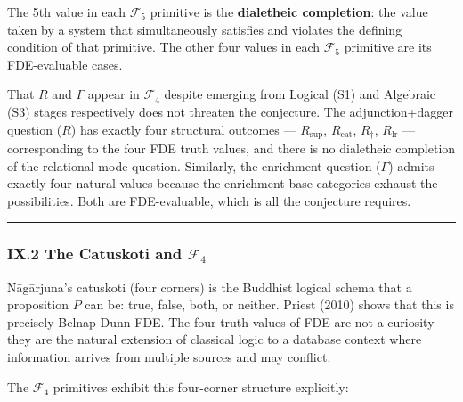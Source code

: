 \documentclass[12pt,a4paper]{article}
\begin{document}
The 5th value in each $\mathcal{F}_5$ primitive is the \textbf{dialetheic completion}: the value taken by a system that simultaneously satisfies and violates the defining condition of that primitive. The other four values in each $\mathcal{F}_5$ primitive are its FDE-evaluable cases.

That $R$ and $\Gamma$ appear in $\mathcal{F}_4$ despite emerging from Logical (S1) and Algebraic (S3) stages respectively does not threaten the conjecture. The adjunction+dagger question ($R$) has exactly four structural outcomes --- $R_\text{sup}$, $R_\text{cat}$, $R_\dagger$, $R_\text{lr}$ --- corresponding to the four FDE truth values, and there is no dialetheic completion of the relational mode question. Similarly, the enrichment question ($\Gamma$) admits exactly four natural values because the enrichment base categories exhaust the possibilities. Both are FDE-evaluable, which is all the conjecture requires.

\begin{center}
\rule{0.5\textwidth}{0.4pt}
\end{center}

\subsubsection{IX.2 The Catuskoti and $\mathcal{F}_4$}

N\={a}g\={a}rjuna's catuskoti (four corners) is the Buddhist logical schema that a proposition $P$ can be: true, false, both, or neither. Priest (2010) shows that this is precisely Belnap-Dunn FDE. The four truth values of FDE are not a curiosity --- they are the natural extension of classical logic to a database context where information arrives from multiple sources and may conflict.

The $\mathcal{F}_4$ primitives exhibit this four-corner structure explicitly:
\end{document}
